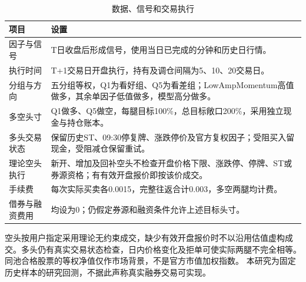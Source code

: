 \documentclass[10pt,compsoc,UTF8]{CjC}
\begin{document}
\begin{table}[H]\centering\normalsize
\caption{数据、信号和交易执行}
\begin{tabularx}{\linewidth}{p{30mm}X}\toprule
项目 & 设置\\\midrule
因子与信号 & T日收盘后形成信号，使用当日已完成的分钟和历史日行情。\\
执行时间 & T+1交易日开盘执行，持有及调仓间隔为5、10、20交易日。\\
分组与方向 & 五分组等权，Q1为看好组、Q5为看差组；LowAmpMomentum高值做多，其余单因子低值做多，模型高分做多。\\
多空头寸 & Q1做多、Q5做空，每腿目标100\%，总目标敞口200\%，采用独立现金与持仓账本。\\
多头交易状态 & 保留历史ST、09:30停复牌、涨跌停价及官方复权因子；受阻买入留现金，受阻减仓保留重试。\\
理论空头执行 & 新开、增加及回补空头不检查开盘价格下限、涨跌停、停牌、ST或券源资格；有有效开盘报价即按该价成交。\\
手续费 & 每次实际买卖各0.0015，完整往返合计0.003，多空两腿均计费。\\
借券与融资费用 & 均设为0；仍假定券源和融资条件允许上述目标头寸。\\\bottomrule
\end{tabularx}\end{table}
空头按用户指定采用理论无约束成交，缺少有效开盘报价时不以沿用估值虚构成交。多头仍有真实交易状态检查，日内价格变化及拒单可使实际两腿不完全相等。
同池合格股票的等权净值仅作市场背景，不是官方市值加权指数。
本研究为固定历史样本的研究回测，不据此声称真实融券交易可实现。

\clearpage
\end{document}
